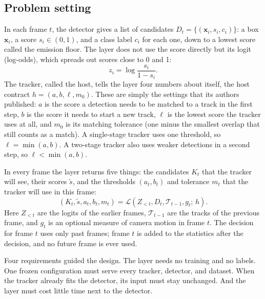\subsection{Problem setting}\label{sec:problem}
In each frame $t$, the detector gives a list of candidates
$D_t=\{(\mathbf{x}_i,s_i,c_i)\}$: a box $\mathbf{x}_i$, a score
$s_i\in(0,1)$, and a class label $c_i$ for each one, down to a lowest score
called the emission floor. The layer does not use the score directly but its
logit (log-odds), which spreads out scores close to 0 and 1:
\begin{equation}
z_i=\log\frac{s_i}{1-s_i}.
\label{eq:logit}
\end{equation}
The tracker, called the host, tells the layer four numbers about itself,
the host contract $h=(a,b,\ell,m_0)$. These are simply the settings that its
authors published: $a$ is the score a detection needs to be matched to a
track in the first step, $b$ is the score it needs to start a new track,
$\ell$ is the lowest score the tracker uses at all, and $m_0$ is its matching
tolerance (one minus the smallest overlap that still counts as a match). A
single-stage tracker uses one threshold, so $\ell=\min(a,b)$. A two-stage
tracker also uses weaker detections in a second step, so
$\ell<\min(a,b)$.

In every frame the layer returns five things: the candidates $K_t$ that
the tracker will see, their scores $\tilde{s}$, and the thresholds
$(a_t,b_t)$ and tolerance $m_t$ that the tracker will use in this frame:
\begin{equation}
\left(K_t,\tilde{s},a_t,b_t,m_t\right)=
\mathcal{L}\left(Z_{<t},D_t,\mathcal{T}_{t-1},g_t;\,h\right).
\label{eq:layer}
\end{equation}
Here $Z_{<t}$ are the logits of the earlier frames, $\mathcal{T}_{t-1}$
are the tracks of the previous frame, and $g_t$ is an optional measure of
camera motion in frame $t$. The decision for frame $t$ uses only past
frames; frame $t$ is added to the statistics after the decision, and no
future frame is ever used.

Four requirements guided the design. The layer needs no training and no
labels. One frozen configuration must serve every tracker, detector, and
dataset. When the tracker already fits the detector, its input must stay
unchanged. And the layer must cost little time next to the detector.


